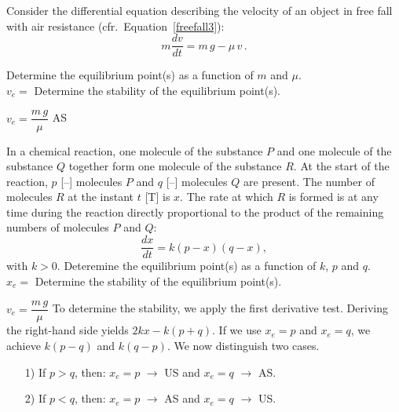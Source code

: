 \begin{Exercise}	
		\Question Consider the differential equation describing the velocity of an object in free fall with air resistance (cfr.\ Equation~\eqref{freefall3}):
	$$
	m\dfrac{{d}v}{{d}t} = m\,g - \mu\,v\,.
	$$
	
		\Question Determine the equilibrium point(s) as a function of $m$ and $\mu$.\\[0.5cm]
		$v_e = $\vspace*{1cm}
		\Question Determine the stability of the equilibrium point(s).
    \EndCurrentQuestion
\end{Exercise}

\begin{Answer}
    \Question $v_e = \dfrac{m\,g}{\mu}$
    \Question AS
\end{Answer}

\begin{Exercise} In a chemical reaction, one molecule of the substance $P$ and one molecule of the substance $Q$ together form
one molecule of the substance $R$.
At the start of the reaction, $p$ [--] molecules $P$ and $q$ [--] molecules $Q$ are present. The number of molecules $R$ at the instant $t$ [T] is $x$. The rate at which $R$ is formed is at any time during the reaction directly proportional to the product of the remaining numbers of molecules $P$ and $Q$:
$$
\dfrac{d x}{d t} = k ( p - x ) ( q - x ), 
$$
with $k>0$.
		\Question Deteremine the equilibrium point(s) as a function of $k$, $p$ and $q$.\\[0.5cm]
		$x_e = $\vspace*{1cm}
		\Question Determine the stability of the equilibrium point(s).
    \EndCurrentQuestion
\end{Exercise}

\begin{Answer}
       \Question $v_e = \dfrac{m\,g}{\mu}$
       \Question To determine the stability, we apply the first derivative test. Deriving the right-hand side yields $2kx - k(p+q)$. If we use $x_e = p$ and $x_e = q$, we achieve $k(p-q)$ and $k(q-p)$. We now distinguish two cases.\\
        \begin{enumerate}
            \item[1)] If $p > q$, then: \quad $x_e = p$ $\rightarrow$ US \quad and \quad $x_e = q$ $\rightarrow$ AS.
            \item[2)] If $p < q$, then: \quad $x_e = p$ $\rightarrow$ AS \quad and \quad $x_e = q$ $\rightarrow$ US.
        \end{enumerate}
    \EndCurrentQuestion
\end{Answer}

